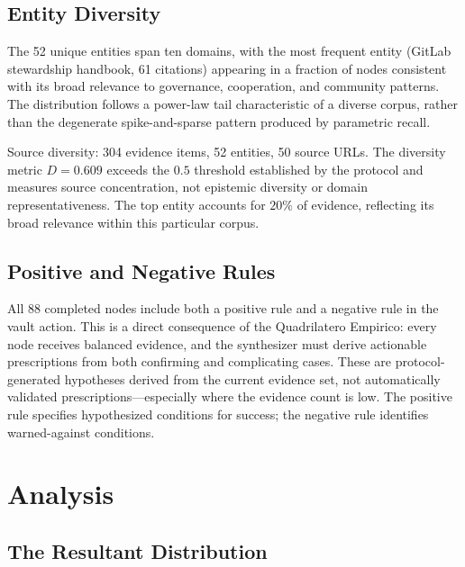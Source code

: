 \documentclass[10pt,twocolumn]{article}
\begin{document}
\subsection{Entity Diversity}

The 52 unique entities span ten domains, with the most frequent entity (GitLab stewardship handbook, 61 citations) appearing in a fraction of nodes consistent with its broad relevance to governance, cooperation, and community patterns. The distribution follows a power-law tail characteristic of a diverse corpus, rather than the degenerate spike-and-sparse pattern produced by parametric recall.

Source diversity: 304 evidence items, 52 entities, 50 source URLs. The diversity metric $D = 0.609$ exceeds the $0.5$ threshold established by the protocol and measures source concentration, not epistemic diversity or domain representativeness. The top entity accounts for $20\%$ of evidence, reflecting its broad relevance within this particular corpus.

\subsection{Positive and Negative Rules}

All 88 completed nodes include both a positive rule and a negative rule in the vault action. This is a direct consequence of the Quadrilatero Empirico: every node receives balanced evidence, and the synthesizer must derive actionable prescriptions from both confirming and complicating cases. These are protocol-generated hypotheses derived from the current evidence set, not automatically validated prescriptions---especially where the evidence count is low. The positive rule specifies hypothesized conditions for success; the negative rule identifies warned-against conditions.

\section{Analysis}
\label{sec:analysis}

\subsection{The Resultant Distribution}
\end{document}
